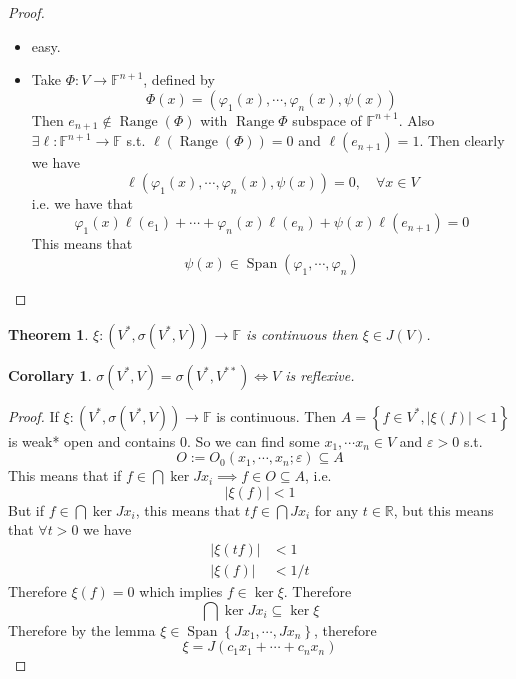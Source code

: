 \documentclass[11pt,a4paper]{article}
\theoremstyle{definition}
\theoremstyle{plain}
\newtheorem{theorem}[definition]{Theorem}
\newtheorem{corollary}[definition]{Corollary}
\theoremstyle{remark}
\newcommand{\F}{\mathbb{F}}
\newcommand{\R}{\mathbb{R}}
\renewcommand{\set}[1]{\left\{ #1 \right\}}
\newcommand{\abs}[1]{\lvert #1 \rvert}
\newcommand{\1}{\mathbbm{1}}
\newcommand{\Span}{\operatorname{Span}}
\begin{document}
\begin{proof}
    \begin{itemize}
        \item[$\impliedby$] easy. 
        \item[$\implies$] Take $\Phi \colon V \to \F^{n+1}$, defined by 
        $$\Phi(x) = (\varphi_1(x), \cdots, \varphi_n(x), \psi(x))$$
        Then $e_{n+1} \not\in \operatorname{Range}(\Phi)$ with $\operatorname{Range} \Phi$ subspace of $\F^{n+1}$. Also $\exists \ell \colon \F^{n+1} \to \F$ s.t. 
        $\ell(\operatorname{Range} (\Phi)) = 0$ and $\ell(e_{n+1}) = 1$. Then clearly we have 
        $$\ell(\varphi_1(x), \cdots, \varphi_n(x), \psi(x)) = 0, \quad \forall x \in V$$
        i.e. we have that 
        $$\varphi_1(x) \ell(e_1) + \cdots + \varphi_n(x) \ell(e_n) + \psi(x) \ell(e_{n+1}) = 0$$
        This means that 
        $$\psi (x) \in \operatorname{Span} (\varphi_1, \cdots, \varphi_n)$$  
    \end{itemize}
\end{proof}

\begin{theorem}
    $\xi \colon (V^*, \sigma(V^*, V)) \to \F$ is continuous then $\xi \in J(V)$.  
\end{theorem}

\begin{corollary}
    $\sigma(V^*, V) = \sigma(V^*, V^{**}) \iff V$ is reflexive.
\end{corollary}

\begin{proof}
    If $\xi \colon (V^*, \sigma(V^*, V)) \to \F$ is continuous. Then $A = \set{f \in V^*, \abs{\xi(f)} < 1}$ is weak* open and contains $0$. So we can find some $x_1, \cdots x_n \in V$ and $\varepsilon > 0$ 
    s.t. 
    $$O := O_0(x_1, \cdots, x_n; \varepsilon) \subseteq A$$
    This means that if $f \in \bigcap \ker J x_i \implies f \in O \subseteq A$, i.e. 
    $$\abs{\xi (f)} < 1$$
    But if $f \in \bigcap \ker J x_i$, this means that $t f \in \bigcap J x_i$ for any $t \in \R$, but this means that $\forall t > 0$ we have
    \begin{align*}
        \abs{\xi (tf)} &< 1 \\
        \abs{\xi(f)} &< 1/t
    \end{align*}
    Therefore $\xi (f) = 0$ which implies $f \in \ker \xi$. Therefore 
    $$\bigcap \ker J x_i \subseteq \ker \xi$$
    Therefore by the lemma $\xi \in \Span \set{Jx_1, \cdots, Jx_n}$, therefore 
    $$\xi = J(c_1 x_1 + \cdots + c_n x_n)$$
\end{proof}
\end{document}
